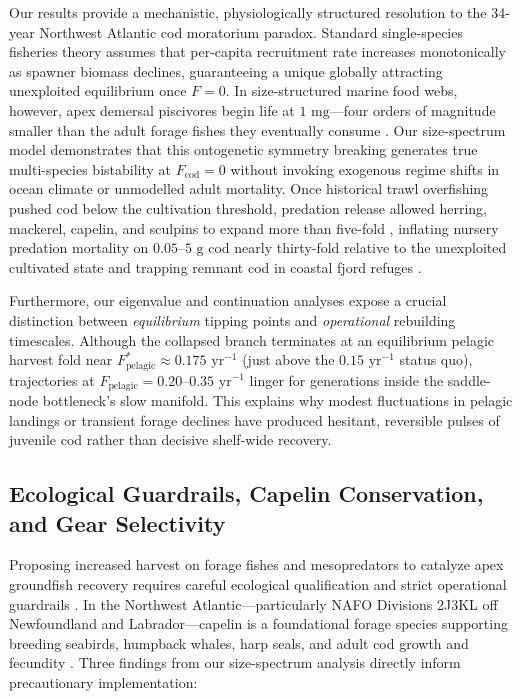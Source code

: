 \documentclass[11pt,letterpaper]{article}
\begin{document}
Our results provide a mechanistic, physiologically structured resolution to the 34-year Northwest Atlantic cod moratorium paradox. Standard single-species fisheries theory assumes that per-capita recruitment rate increases monotonically as spawner biomass declines, guaranteeing a unique globally attracting unexploited equilibrium once $F = 0$. In size-structured marine food webs, however, apex demersal piscivores begin life at $1\text{ mg}$---four orders of magnitude smaller than the adult forage fishes they eventually consume \citep{walters2001cultivation,andersen2019fish}. Our size-spectrum model demonstrates that this ontogenetic symmetry breaking generates true multi-species bistability at $F_{\mathrm{cod}} = 0$ without invoking exogenous regime shifts in ocean climate or unmodelled adult mortality. Once historical trawl overfishing pushed cod below the cultivation threshold, predation release allowed herring, mackerel, capelin, and sculpins to expand more than five-fold \citep{frank2005trophic}, inflating nursery predation mortality on $0.05$--$5\text{ g}$ cod nearly thirty-fold relative to the unexploited cultivated state and trapping remnant cod in coastal fjord refuges \citep{lilly2013review}.

Furthermore, our eigenvalue and continuation analyses expose a crucial distinction between \emph{equilibrium} tipping points and \emph{operational} rebuilding timescales. Although the collapsed branch terminates at an equilibrium pelagic harvest fold near $F_{\mathrm{pelagic}}^{*} \approx 0.175\text{ yr}^{-1}$ (just above the $0.15\text{ yr}^{-1}$ status quo), trajectories at $F_{\mathrm{pelagic}} = 0.20$--$0.35\text{ yr}^{-1}$ linger for generations inside the saddle-node bottleneck's slow manifold. This explains why modest fluctuations in pelagic landings or transient forage declines \citep{frank2011transient} have produced hesitant, reversible pulses of juvenile cod rather than decisive shelf-wide recovery.

\subsection{Ecological Guardrails, Capelin Conservation, and Gear Selectivity}

Proposing increased harvest on forage fishes and mesopredators to catalyze apex groundfish recovery requires careful ecological qualification and strict operational guardrails \citep{pikitch2012little,garcia2012reconsidering}. In the Northwest Atlantic---particularly NAFO Divisions 2J3KL off Newfoundland and Labrador---capelin is a foundational forage species supporting breeding seabirds, humpback whales, harp seals, and adult cod growth and fecundity \citep{rose2002capelin,lilly2013review}. Three findings from our size-spectrum analysis directly inform precautionary implementation:
\end{document}
